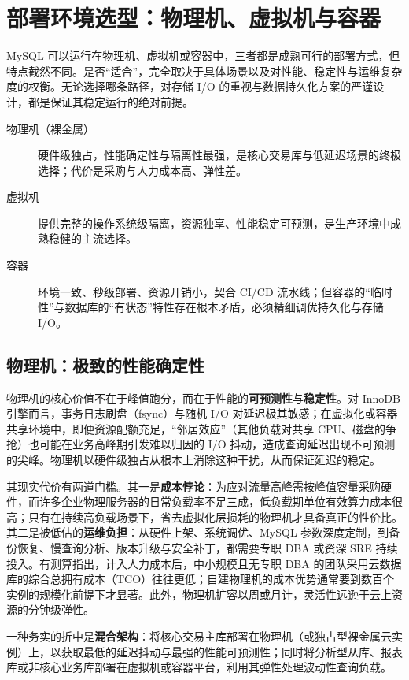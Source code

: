 \documentclass[12pt,UTF8]{ctexbook}
\begin{document}
\section{部署环境选型：物理机、虚拟机与容器}
\label{sec:deployment-env-selection}

MySQL 可以运行在物理机、虚拟机或容器中，三者都是成熟可行的部署方式，但特点截然不同。是否“适合”，完全取决于具体场景以及对性能、稳定性与运维复杂度的权衡。无论选择哪条路径，对存储 I/O 的重视与数据持久化方案的严谨设计，都是保证其稳定运行的绝对前提。

\begin{description}
  \item[物理机（裸金属）] 硬件级独占，性能确定性与隔离性最强，是核心交易库与低延迟场景的终极选择；代价是采购与人力成本高、弹性差。
  \item[虚拟机] 提供完整的操作系统级隔离，资源独享、性能稳定可预测，是生产环境中成熟稳健的主流选择。
  \item[容器] 环境一致、秒级部署、资源开销小，契合 CI/CD 流水线；但容器的“临时性”与数据库的“有状态”特性存在根本矛盾，必须精细调优持久化与存储 I/O。
\end{description}

\subsection{物理机：极致的性能确定性}

物理机的核心价值不在于峰值跑分，而在于性能的\textbf{可预测性}与\textbf{稳定性}。对 InnoDB 引擎而言，事务日志刷盘（fsync）与随机 I/O 对延迟极其敏感；在虚拟化或容器共享环境中，即便资源配额充足，“邻居效应”（其他负载对共享 CPU、磁盘的争抢）也可能在业务高峰期引发难以归因的 I/O 抖动，造成查询延迟出现不可预测的尖峰。物理机以硬件级独占从根本上消除这种干扰，从而保证延迟的稳定。

其现实代价有两道门槛。其一是\textbf{成本悖论}：为应对流量高峰需按峰值容量采购硬件，而许多企业物理服务器的日常负载率不足三成，低负载期单位有效算力成本很高；只有在持续高负载场景下，省去虚拟化层损耗的物理机才具备真正的性价比。其二是被低估的\textbf{运维负担}：从硬件上架、系统调优、MySQL 参数深度定制，到备份恢复、慢查询分析、版本升级与安全补丁，都需要专职 DBA 或资深 SRE 持续投入。有测算指出，计入人力成本后，中小规模且无专职 DBA 的团队采用云数据库的综合总拥有成本（TCO）往往更低；自建物理机的成本优势通常要到数百个实例的规模化前提下才显著。此外，物理机扩容以周或月计，灵活性远逊于云上资源的分钟级弹性。

一种务实的折中是\textbf{混合架构}：将核心交易主库部署在物理机（或独占型裸金属云实例）上，以获取最低的延迟抖动与最强的性能可预测性；同时将分析型从库、报表库或非核心业务库部署在虚拟机或容器平台，利用其弹性处理波动性查询负载。
\end{document}
